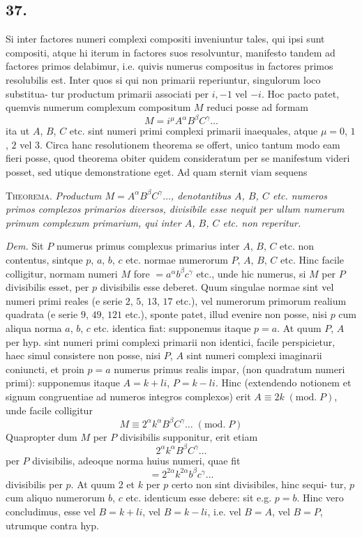 \documentclass[twoside,12pt, showframe]{memoir}
\renewcommand{\pmod}[1]{\;(\textrm{mod.}\;#1)}
\begin{document}
\subsection*{37.}
 
Si inter factores numeri complexi compositi inveniuntur tales, qui ipsi sunt compositi, atque hi iterum in factores suos resolvuntur, manifesto tandem ad factores primos delabimur, i.e. quivis numerus compositus in factores primos resolubilis est. Inter quos si qui non primarii reperiuntur, singulorum loco substitua-\clearpage\noindent%
tur productum primarii associati per \(i,-1\) vel \(-i\). Hoc pacto patet, quemvis numerum complexum compositum \(M\) reduci posse ad formam
\[M=i^{\mu} A^{\alpha} B^{\beta} C^{\gamma} \ldots\]
ita ut \(A\), \(B\), \(C\) etc. sint numeri primi complexi primarii inaequales, atque \(\mu=0\), \(1\), \(2\) vel \(3\). Circa hanc resolutionem theorema se offert, unico tantum modo eam fieri posse, quod theorema obiter quidem consideratum per se manifestum videri posset, sed utique demonstratione eget. Ad quam sternit viam sequens

\textsc{Theorema.} \textit{Productum \(M=A^{\alpha} B^{\beta} C^{\gamma} \ldots\), denotantibus \(A\), \(B\), \(C\) etc. numeros primos complexos primarios diversos, divisibile esse nequit per ullum numerum primum complexum primarium, qui inter \(A\), \(B\), \(C\) etc. non reperitur.}
 
\textit{Dem.} Sit \(P\) numerus primus complexus primarius inter \(A\), \(B\), \(C\) etc. non contentus, sintque \(p\), \(a\), \(b\), \(c\) etc. normae numerorum \(P\), \(A\), \(B\), \(C\) etc. Hinc facile colligitur, normam numeri \(M\) fore \(=a^{\alpha} b^{\beta} c^{\gamma}\) etc., unde hic numerus, si \(M\) per \({P}\) divisibilis esset, per \(p\) divisibilis esse deberet. Quum singulae normae sint vel numeri primi reales (e serie \(2\), \(5\), \(13\), \(17\) etc.), vel numerorum primorum realium quadrata (e serie \(9\), \(49\), \(121\) etc.), sponte patet, illud evenire non posse, nisi \(p\) cum aliqua norma \(a\), \(b\), \(c\) etc. identica fiat: supponemus itaque \(p=a\). At quum \(P\), \(A\) per hyp. sint numeri primi complexi primarii non identici, facile perspicietur, haec simul consistere non posse, nisi \(P\), \(A\) sint numeri complexi imaginarii coniuncti, et proin \(p=a\) numerus primus realis impar, (non quadratum numeri primi): supponemus itaque \(A=k+l i\), \(P=k-l i\). Hinc (extendendo notionem et signum congruentiae ad numeros integros complexos) erit \(A \equiv 2 k\pmod{P}\), unde facile colligitur
\[M \equiv 2^{\alpha} k^{\alpha} B^{\beta} C^{\gamma} \ldots\pmod{P}\]
Quapropter dum \(M\) per \(P\) divisibilis supponitur, erit etiam
\[2^{\alpha} k^{\alpha} B^{\beta} C^{\gamma} \ldots\]
per \(P\) divisibilis, adeoque norma huius numeri, quae fit
\[=2^{2 \alpha} k^{2 \alpha} b^{\beta} c^{\gamma} \ldots\]
divisibilis per \(p\). At quum 2 et \(k\) per \(p\) certo non sint divisibiles, hinc sequi-\clearpage\noindent%
tur, \(p\) cum aliquo numerorum \(b\), \(c\) etc. identicum esse debere: sit e.g. \(p=b\). Hinc vero concludimus, esse vel \(B=k+l i\), vel \(B=k-l i\), i.e. vel \(B=A\), vel \(B=P\), utrumque contra hyp.
 
\end{document}
